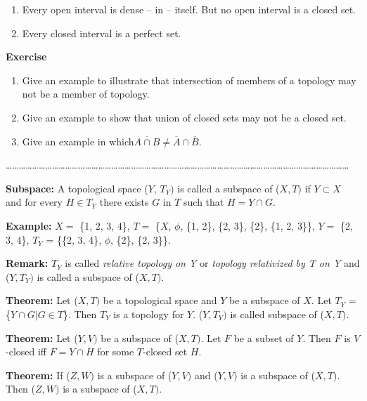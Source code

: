\documentclass[12pt]{amsart}
\begin{document}
\begin{enumerate}
\item Every open interval is dense -- in -- itself. But no open interval is a closed set.
\item Every closed interval is a perfect set.
\end{enumerate}
\textbf{Exercise}

\begin{enumerate}
\item Give an example to illustrate that intersection of members of a topology may not be a member of topology.
\item Give an example to show that union of closed sets may not be a closed set.
\item Give an example in which$\overline {A\cap B} \ne \overline A \cap \overline B $.
\end{enumerate}
{\ldots}{\ldots}{\ldots}{\ldots}{\ldots}{\ldots}{\ldots}{\ldots}{\ldots}{\ldots}{\ldots}{\ldots}{\ldots}{\ldots}{\ldots}{\ldots}{\ldots}{\ldots}{\ldots}{\ldots}{\ldots}{\ldots}{\ldots}{\ldots}{\ldots}{\ldots}{\ldots}{\ldots}{\ldots}{\ldots}{\ldots}{\ldots}{\ldots}{\ldots}{\ldots}{\ldots}{\ldots}{\ldots}{\ldots}{\ldots}{\ldots}{\ldots}{\ldots}{\ldots}{\ldots}{\ldots}{\ldots}{\ldots}{\ldots}{\ldots}{\ldots}{\ldots}

\textbf{Subspace:} A topological space ($Y$, $T_{Y})$ is called a subspace of 
($X, T)$ if $Y\subset X$ and for every $H\in T_{Y}$ there exists $G$ in $T$ such that $H = Y\cap 
G$.

\textbf{Example:} $X =$ {\{}1, 2, 3, 4{\}}, $T =$ {\{}$X$, $\phi $, {\{}1, 2{\}}, {\{}2, 
3{\}}, {\{}2{\}}, {\{}1, 2, 3{\}}{\}}, $Y =$ {\{}2, 3, 4{\}}, $T_{Y}$ = {\{}{\{}2, 
3, 4{\}}, $\phi $, {\{}2{\}}, {\{}2, 3{\}}{\}}.

\textbf{Remark:} $T_{Y}$ is called \textit{relative topology on Y} or \textit{topology relativized by T on Y} and ($Y, T_{Y})$ is called a subspace of 
($X, T)$.

\textbf{Theorem:} Let ($X, T)$ be a topological space and $Y$ be a subspace of $X$. Let 
$T_{Y}$ = {\{}$Y\cap G\vert G\in T${\}}. Then $T_{Y}$ is a topology for $Y$. ($Y, T_{Y})$ 
is called subspace of ($X, T)$.

\textbf{Theorem:} Let ($Y, V)$ be a subspace of ($X, T)$. Let $F$ be a subset of $Y$. Then $F$ is 
$V$-closed iff $F = Y\cap H$ for some $T$-closed set $H$.

\textbf{Theorem:} If ($Z, W)$ is a subspace of ($Y, V)$ and ($Y, V)$ is a subspace of ($X, T)$. Then 
($Z, W)$ is a subspace of ($X, T)$.
\end{document}
